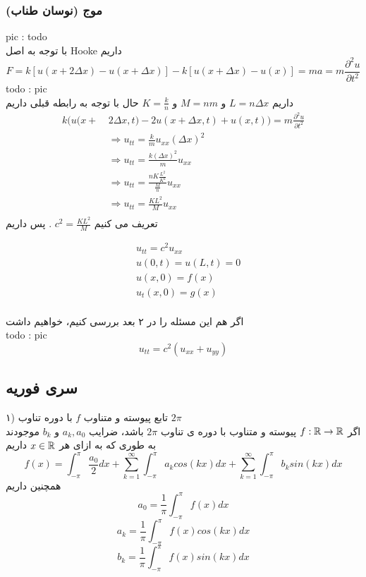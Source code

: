 \subsubsection{موج (نوسان طناب)}
pic : todo\\
با توجه به اصل
Hooke
 داریم
 \[
 F=k[u(x+2\Delta x)-u(x+\Delta x)]-k[u(x+\Delta x)-u(x)]=ma=m\frac{\partial^2 u}{\partial t^2}
 \]
 todo : pic\\
 داریم 
 $L=n\Delta x$
 و
 $M=nm$
 و
 $K=\frac{k}{n}$
 حال با توجه به رابطه قبلی داریم
 \begin{equation*}
 \begin{aligned}
 k\Big(u(x+{}&\ 2\Delta x,t)- 2u(x+\Delta x,t)+u(x,t)\Big)=m\frac{\partial^2 u}{\partial t^2}\\
 &\  \Rightarrow  u_{tt}=\frac{k}{m}u_{xx}(\Delta x)^2\\
 &\  \Rightarrow u_{tt}=\frac{k(\Delta x)^2}{m}u_{xx}\\ 
 &\ \Rightarrow u_{tt}=\frac{nK\frac{L^2}{K^2}}{\frac{M}{n}}u_{xx}\\
 &\  \Rightarrow u_{tt}=\frac{KL^2}{M}u_{xx} \\
 \end{aligned}
 \end{equation*}
تعریف می کنیم
$c^2 = \frac{KL^2}{M}$
.
پس داریم

\begin{equation*}
\begin{aligned}
{}&\ u_{tt}=c^2u_{xx} \\
&\ u(0,t)=u(L,t)=0 \\
&\ u(x,0)=f(x) \\
&\ u_t(x,0)=g(x) \\
\end{aligned}
\end{equation*}

اگر هم این مسئله را در ۲ بعد بررسی کنیم، خواهیم داشت\\
todo : pic\\
\[
u_{tt}=c^2(u_{xx}+u_{yy})
\]

\subsection*{سری فوریه}
۱) تابع پیوسته و متناوب
$f$
 با دوره تناوب
 $2\pi$\\
 اگر 
 $f:\mathbb{R}\to\mathbb{R}$
 پیوسته و متناوب با دوره ی تناوب 
 $2\pi$
 باشد، ضرایب
 $a_k,a_0$
 و
 $b_k$
 موجودند به طوری که به ازای هر
 $x\in\mathbb{R}$
 داریم
 \begin{equation}
 f(x)=\int_{-\pi}^\pi{\frac{a_0}{2}dx}+\sum_{k=1}^\infty {\int_{-\pi}^\pi{a_kcos(kx)dx}}+\sum_{k=1}^\infty{\int_{-\pi}^\pi{b_ksin(kx)dx}}
 \end{equation}
 همچنین داریم
 \begin{equation}
 a_0=\frac{1}{\pi}\int_{-\pi}^\pi {f(x)dx}
 \end{equation}
 \begin{equation}
 a_k=\frac{1}{\pi}\int_{-\pi}^\pi {f(x)cos(kx)dx}
 \end{equation}
  \begin{equation}
 b_k=\frac{1}{\pi}\int_{-\pi}^\pi {f(x)sin(kx)dx}
 \end{equation}
 
